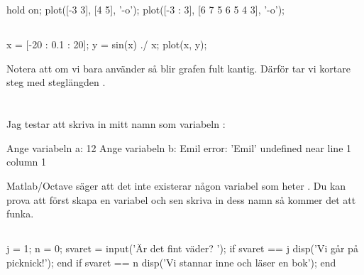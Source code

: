 \section*{}

\subsection*{}
\vspace{3pt}
\begin{matlab}
hold on;
plot([-3 3], [4 5], '-o');
plot([-3 : 3], [6 7 5 6 5 4 3], '-o');
\end{matlab}

\subsection*{}
\vspace{3pt}
\begin{matlab}
x = [-20 : 0.1 : 20];
y = sin(x) ./ x;
plot(x, y);
\end{matlab}
Notera att om vi bara använder  så blir grafen fult kantig. Därför tar vi kortare steg med steglängden .


\section*{}

\subsection*{}
Jag testar att skriva in mitt namn som variabeln :
\vspace{10pt}
\begin{matlab}
Ange variabeln a: 12
Ange variabeln b: Emil
error: 'Emil' undefined near line 1 column 1
\end{matlab}
Matlab/Octave säger att det inte existerar någon variabel som heter . Du kan prova att först skapa en variabel och sen skriva in dess namn så kommer det att funka.
\newpage
\subsection*{}
\vspace{3pt}
\begin{matlab}
j = 1;
n = 0;
svaret = input('Är det fint väder? ');
if svaret == j
    disp('Vi går på picknick!');
end
if svaret == n
    disp('Vi stannar inne och läser en bok');
end
\end{matlab}

